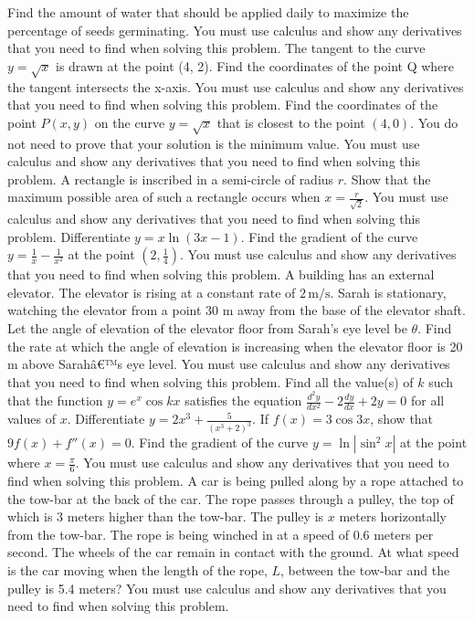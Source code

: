 \documentclass[12pt,addpoints]{exam}
\begin{document}
\begin{questions}
Find the amount of water that should be applied daily to maximize the percentage of seeds germinating. You must use calculus and show any derivatives that you need to find when solving this problem.
\fillwithlines{3cm}
\question[5] The tangent to the curve \( y = \sqrt{x} \) is drawn at the point (4, 2). Find the coordinates of the point Q where the tangent intersects the x-axis. You must use calculus and show any derivatives that you need to find when solving this problem.
\fillwithlines{3cm}
\question[5] Find the coordinates of the point \( P(x, y) \) on the curve \( y = \sqrt{x} \) that is closest to the point \( (4, 0) \). You do not need to prove that your solution is the minimum value. You must use calculus and show any derivatives that you need to find when solving this problem.
\fillwithlines{3cm}
\question[5] A rectangle is inscribed in a semi-circle of radius \( r \). Show that the maximum possible area of such a rectangle occurs when \( x = \frac{r}{\sqrt{2}} \). You must use calculus and show any derivatives that you need to find when solving this problem.
\fillwithlines{3cm}
\question[5] Differentiate \( y = x \ln(3x - 1) \).
\fillwithlines{3cm}
\question[5] Find the gradient of the curve \( y = \frac{1}{x} - \frac{1}{x^2} \) at the point \( \left( 2, \frac{1}{4} \right) \). You must use calculus and show any derivatives that you need to find when solving this problem.
\fillwithlines{3cm}
\question[5] A building has an external elevator. The elevator is rising at a constant rate of \(2 \, \text{m/s}\). Sarah is stationary, watching the elevator from a point 30 m away from the base of the elevator shaft. Let the angle of elevation of the elevator floor from Sarah's eye level be \(\theta\). Find the rate at which the angle of elevation is increasing when the elevator floor is 20 m above Sarahâ€™s eye level. You must use calculus and show any derivatives that you need to find when solving this problem.
\fillwithlines{3cm}
\question[5] Find all the value(s) of \( k \) such that the function \( y = e^x \cos kx \) satisfies the equation \(\frac{d^2y}{dx^2} - 2 \frac{dy}{dx} + 2y = 0\) for all values of \( x \).
\fillwithlines{3cm}
\question[5] Differentiate \( y = 2x^3 + \frac{5}{(x^3 + 2)^3} \).
\fillwithlines{3cm}
\question[5] If \( f(x) = 3 \cos 3x \), show that \( 9f(x) + f''(x) = 0 \).
\fillwithlines{3cm}
\question[5] Find the gradient of the curve \( y = \ln |\sin^2 x| \) at the point where \( x = \frac{\pi}{6} \). You must use calculus and show any derivatives that you need to find when solving this problem.
\fillwithlines{3cm}
\question[5] A car is being pulled along by a rope attached to the tow-bar at the back of the car. The rope passes through a pulley, the top of which is 3 meters higher than the tow-bar. The pulley is \( x \) meters horizontally from the tow-bar. The rope is being winched in at a speed of 0.6 meters per second. The wheels of the car remain in contact with the ground. At what speed is the car moving when the length of the rope, \( L \), between the tow-bar and the pulley is 5.4 meters? You must use calculus and show any derivatives that you need to find when solving this problem.

\end{questions}
\end{document}
